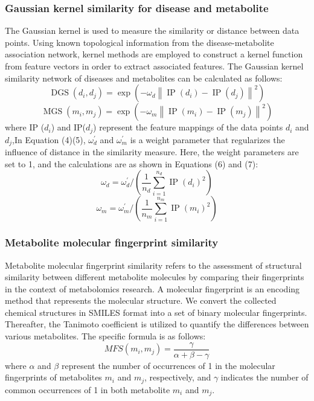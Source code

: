 \documentclass[lettersize,journal]{IEEEtran}
\begin{document}
\subsubsection{\textbf{Gaussian kernel similarity for disease and metabolite}}
The Gaussian kernel\cite{ter2003gaussian} is used to measure the similarity or distance between data points. Using known topological information from the disease-metabolite association network, kernel methods are employed to construct a kernel function from feature vectors in order to extract associated features. The Gaussian kernel similarity network\cite{van2011gaussian} of diseases and metabolites can be calculated as follows:
\begin{equation}
	\operatorname{DGS}(d_{i}, d_{j})=\exp\left(-\omega_{d}\left\|\operatorname{IP}(d_{i})-\operatorname{IP}(d_{j})\right\|^{2}\right)
\end{equation}
\begin{equation}
	\operatorname{MGS}(m_{i}, m_{j})=\exp\left(-\omega_{m}\left\|\operatorname{IP}(m_{i})-\operatorname{IP}(m_{j})\right\|^{2}\right)
\end{equation}
where IP ($d_{i}$) and  IP($d_{j}$) represent the feature mappings of the data points  $d_{i}$ and $d_{j}$,In Equation (4)(5),
$\omega_{d}^{\prime}$ and $\omega_{m}^{\prime}$ is a weight parameter that regularizes the influence of distance in the similarity measure. Here, the weight parameters are set to 1, and the calculations are as shown in Equations (6) and (7):
\begin{equation}
	\omega_{d} = \omega_{d}^{\prime} / \left(\frac{1}{n_{d}} \sum_{i=1}^{n_{d}} \operatorname{IP}(d_{i})^{2}\right)
\end{equation}
\begin{equation}
	\omega_{m} = \omega_{m}^{\prime} / \left(\frac{1}{n_{m}} \sum_{i=1}^{n_{m}} \operatorname{IP}(m_{i})^{2}\right)
\end{equation}


\subsubsection{\textbf{Metabolite molecular fingerprint similarity}}
Metabolite molecular fingerprint similarity\cite{gao2023predicting} refers to the assessment of structural similarity between different metabolite molecules by comparing their fingerprints in the context of metabolomics research. A molecular fingerprint is an encoding method that represents the molecular structure. We convert the collected chemical structures in SMILES format into a set of binary molecular fingerprints. Thereafter, the Tanimoto coefficient\cite{lim2016large,willett1998chemical} is utilized to quantify the differences between various metabolites. The specific formula is as follows:
\begin{equation}
	MFS(m_{i}, m_{j}) = \frac{\gamma}{\alpha + \beta - \gamma}
\end{equation}
where \( \alpha \) and \( \beta \) represent the number of occurrences of 1 in the molecular fingerprints of metabolites \( m_{i} \) and \( m_{j} \), respectively, and \( \gamma \) indicates the number of common occurrences of 1 in both metabolite \( m_{i} \) and \( m_{j} \).
\end{document}
